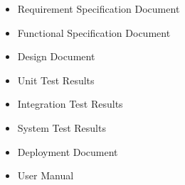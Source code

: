 \label{sec:lists}
\begin{itemize}
\item Requirement Specification Document
\item Functional Specification Document 
\item Design Document 
\item Unit Test Results 
\item Integration Test Results 
\item System Test Results 
\item Deployment Document 
\item User Manual
\end{itemize}